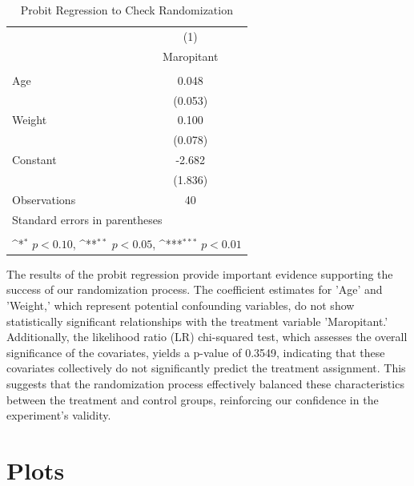 \documentclass{article}
\newcommand{\sym}[1]{%
  \ifmmode^{#1}\else\(^{#1}\)\fi%
}
\begin{document}
\begin{table}[htbp]
    \centering
    \caption{Probit Regression to Check Randomization}
    \begin{tabular}{l*{1}{c}}
        \toprule
                            &\multicolumn{1}{c}{(1)}\\
                            &\multicolumn{1}{c}{Maropitant}\\
        \midrule
                &                     \\
        Age                 & 0.048               \\
                            & (0.053)             \\
        \addlinespace
        Weight              & 0.100               \\
                            & (0.078)             \\
        \addlinespace
        Constant            & -2.682              \\
                            & (1.836)             \\
        \midrule
        Observations        & 40                  \\
        \bottomrule
        \multicolumn{2}{l}{\footnotesize Standard errors in parentheses}\\
        \multicolumn{2}{l}{\footnotesize  }\\
        \multicolumn{2}{l}{\footnotesize \sym{*} \(p<0.10\), \sym{**} \(p<0.05\), \sym{***} \(p<0.01\)}\\
    \end{tabular}
\end{table}
    
The results of the probit regression provide important evidence supporting the success of our randomization process.
The coefficient estimates for 'Age' and 'Weight,' which represent potential confounding variables, do not show
statistically significant relationships with the treatment variable 'Maropitant.' Additionally, the likelihood ratio
(LR) chi-squared test, which assesses the overall significance of the covariates, yields a p-value of 0.3549,
indicating that these covariates collectively do not significantly predict the treatment assignment. This suggests
that the randomization process effectively balanced these characteristics between the treatment and control groups,
reinforcing our confidence in the experiment's validity.
    



\section{Plots}
\end{document}
